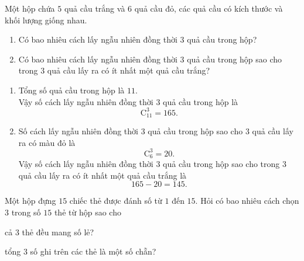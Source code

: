 \begin{bt}%
Một hộp chứa $5$ quả cầu trắng và $6$ quả cầu đỏ, các quả cầu có kích thước và khối lượng giống nhau.
\begin{enumerate}
\item Có bao nhiêu cách lấy ngẫu nhiên đồng thời $3$ quả cầu trong hộp?
\item Có bao nhiêu cách lấy ngẫu nhiên đồng thời $3$ quả cầu trong hộp sao cho trong $3$ quả cầu lấy ra có ít nhất một quả cầu trắng?
\end{enumerate}
\loigiai
{
\begin{enumerate}
\item Tổng số quả cầu trong hộp là $11$. \\
Vậy số cách lấy ngẫu nhiên đồng thời $3$ quả cầu trong hộp là
$$\mathrm{C}_{11}^3=165.$$
\item Số cách lấy ngẫu nhiên đồng thời $3$ quả cầu trong hộp sao cho $3$ quả cầu lấy ra có màu đỏ là
$$\mathrm{C}_{6}^{3}=20.$$
Vậy số cách lấy ngẫu nhiên đồng thời $3$ quả cầu trong hộp sao cho trong $3$ quả cầu lấy ra có ít nhất một quả cầu trắng là
$$165-20=145.$$
\end{enumerate}
}
\end{bt}

\begin{bt}%
		Một hộp đựng $15$ chiếc thẻ được đánh số từ $1$ đến $15$. Hỏi có bao nhiêu cách chọn $3$ trong số $15$ thẻ từ hộp sao cho
		\begin{listEX}
			\item cả $3$ thẻ đều mang số lẻ?
			\item tổng $3$ số ghi trên các thẻ là một số chẵn?
		\end{listEX}
	\end{bt}

